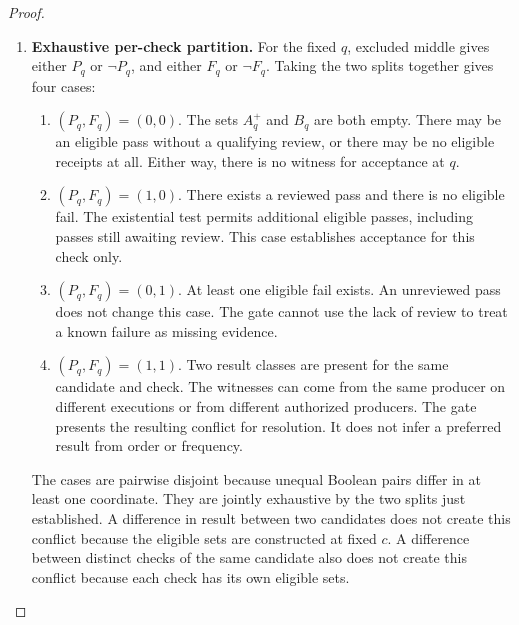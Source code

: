 \begin{proof}
\begin{enumerate}
\item \textbf{Exhaustive per-check partition.}
For the fixed $q$, excluded middle gives either $P_q$
or $\neg P_q$, and either $F_q$ or $\neg F_q$.
Taking the two splits together gives four cases:
\begin{enumerate}
\item $(P_q,F_q)=(0,0)$.
The sets $A_q^+$ and $B_q$ are both empty.
There may be an eligible pass without a qualifying review,
or there may be no eligible receipts at all.
Either way, there is no witness for acceptance at $q$.
\item $(P_q,F_q)=(1,0)$.
There exists a reviewed pass and there is no eligible fail.
The existential test permits additional eligible passes,
including passes still awaiting review.
This case establishes acceptance for this check only.
\item $(P_q,F_q)=(0,1)$.
At least one eligible fail exists.
An unreviewed pass does not change this case.
The gate cannot use the lack of review to treat a known failure
as missing evidence.
\item $(P_q,F_q)=(1,1)$.
Two result classes are present for the same candidate and check.
The witnesses can come from the same producer on different
executions or from different authorized producers.
The gate presents the resulting conflict for resolution.
It does not infer a preferred result from order or frequency.
\end{enumerate}
The cases are pairwise disjoint because unequal Boolean pairs
differ in at least one coordinate.
They are jointly exhaustive by the two splits just established.
A difference in result between two candidates does not create
this conflict because the eligible sets are constructed at fixed $c$.
A difference between distinct checks of the same candidate
also does not create this conflict because each check has its own
eligible sets.


\end{enumerate}
\end{proof}
